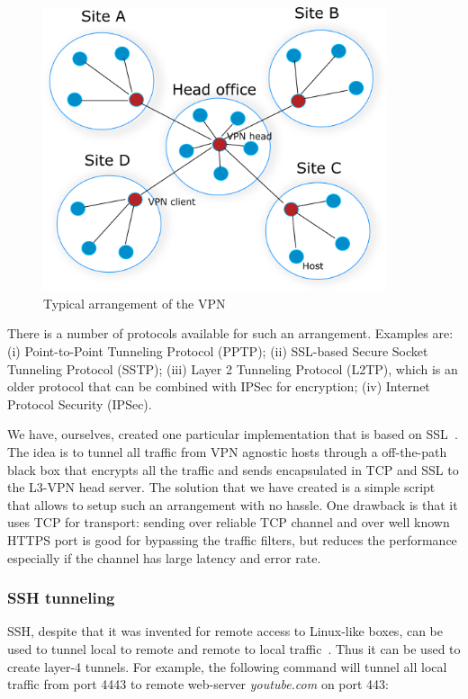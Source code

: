 \begin{figure}[ht!]
    \centering
    \includegraphics[width=0.9\textwidth]{graphics/vpn-central.png}
    \caption{Typical arrangement of the VPN}
    \label{fig:head-vpn}
\end{figure}

There is a number of protocols available for such an arrangement. Examples are:
(i) Point-to-Point Tunneling Protocol (PPTP); (ii) SSL-based 
Secure Socket Tunneling Protocol (SSTP); (iii) Layer 2 Tunneling Protocol (L2TP), 
which is an older protocol that can be combined with IPSec for encryption; 
(iv) Internet Protocol Security (IPSec). 

We have, ourselves, created one particular implementation that is based on SSL~\cite{ssl:vpn}.
The idea is to tunnel all traffic from VPN agnostic hosts through a off-the-path 
black box that encrypts all the traffic and sends encapsulated in TCP and SSL
to the L3-VPN head server. The solution that we have created is a simple script 
that allows to setup such an arrangement with no hassle. One drawback is that it 
uses TCP for transport: sending over reliable TCP channel and over well known HTTPS port
is good for bypassing the traffic filters, but reduces the performance especially if
the channel has large latency and error rate. 


\subsubsection{SSH tunneling}

SSH, despite that it was invented for remote access to Linux-like boxes, can be used 
to tunnel local to remote and remote to local traffic~\cite{ssh:tunneling}. Thus it can be used to create
layer-4 tunnels. For example, the following command will tunnel all local traffic from
port 4443 to remote web-server {\it youtube.com} on port 443:

